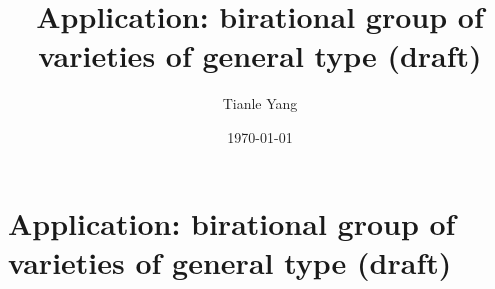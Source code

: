 \documentclass{noteformyself}
\title{Application: birational group of varieties of general type (draft)}
\author{Tianle Yang}
\date{\today}
\begin{document}
    \maketitle

    \section{Application: birational group of varieties of general type (draft)}



    \printbibliography[heading=bibintoc, title={References}] %
\end{document}
